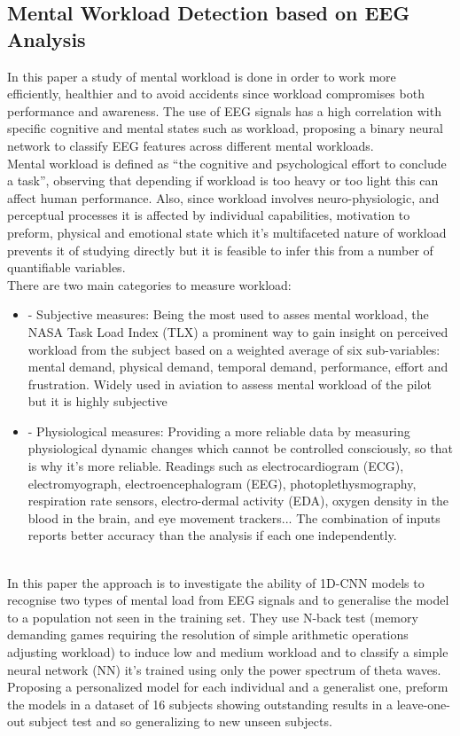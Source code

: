 ﻿\documentclass[10pt,a4paper,twocolumn,twoside]{article}
\begin{document}
\subsection{Mental Workload Detection based on EEG Analysis}
\label{subsec-work1}
In this paper a study of mental workload is done in order to work more efficiently, healthier and to avoid accidents since workload compromises both performance and awareness. The use of EEG signals has a high correlation with specific cognitive and mental states such as workload, proposing a binary neural network to classify EEG features across different mental workloads.
\\
Mental workload is defined as “the cognitive and psychological effort to conclude a task”, observing that depending if workload is too heavy or too light this can affect human performance. Also, since workload involves neuro-physiologic, and perceptual processes it is affected by individual capabilities, motivation to preform, physical and emotional state which it’s multifaceted nature of workload prevents it of studying directly but it is feasible to infer this from a number of quantifiable variables.
\\
There are two main categories to measure workload:
\\
\begin{itemize}
\item   -	Subjective measures: Being the most used to asses mental workload, the NASA Task Load Index (TLX) a prominent way to gain insight on perceived workload from the subject based on a weighted average of six sub-variables: mental demand, physical demand, temporal demand, performance, effort and frustration. Widely used in aviation to assess mental workload of the pilot but it is highly subjective
\item -	Physiological measures: Providing a more reliable data by measuring physiological dynamic changes which cannot be controlled consciously, so that is why it’s more reliable. Readings such as electrocardiogram (ECG), electromyograph, electroencephalogram (EEG), photoplethysmography, respiration rate sensors, electro-dermal activity (EDA), oxygen density in the blood in the brain, and eye movement trackers... The combination of inputs reports better accuracy than the analysis if each one independently.
\end{itemize}
\leavevmode\\
In this paper the approach is to investigate the ability of 1D-CNN models to recognise two types of mental load from EEG signals and to generalise the model to a population not seen in the training set. They use N-back test (memory demanding games requiring the resolution of simple arithmetic operations adjusting workload) to induce low and medium workload and to classify a simple neural network (NN) it’s trained using only the power spectrum of theta waves. Proposing a personalized model for each individual and a generalist one, preform the models in a dataset of 16 subjects showing outstanding results in a leave-one-out subject test and so generalizing to new unseen subjects.
\end{document}
